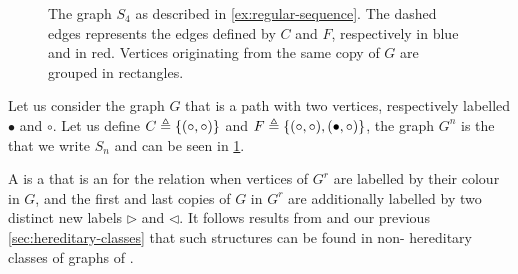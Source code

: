 \begin{figure}
	\centering
  \caption{The graph $S_4$ as described in \cref{ex:regular-sequence}.
  The dashed edges represents the edges defined by $C$ and $F$,
  respectively in \textcolor{A4}{blue} and in \textcolor{B2}{red}.
  Vertices originating from the same copy of $G$ are grouped in 
  rectangles.
  }
  
  \label{fig:split-permutation-n}
\end{figure}

\begin{example}
  \label{ex:regular-sequence}
  Let us consider the graph $G$ that is a path with two vertices, 
  respectively labelled $\bullet$ and $\circ$. Let us define
  $C \triangleq \{ (\circ,\circ) \}$ and $F \triangleq \{ (\circ,\circ), (\bullet,\circ) \}$,
  the graph $G^n$ is the  
  that we write $S_n$ and can be seen in \cref{fig:split-permutation-n}.
\end{example}



\AP A  is a  that is an
 for the  relation when vertices of
$G^r$ are labelled by their colour in $G$, and the first and last copies of $G$
in $G^r$ are additionally labelled by two distinct new labels $\triangleright$
and $\triangleleft$. It follows results from \cite{LOPEZ24} and our previous
\cref{sec:hereditary-classes} that such structures can be found in
non- hereditary classes of graphs of
.

